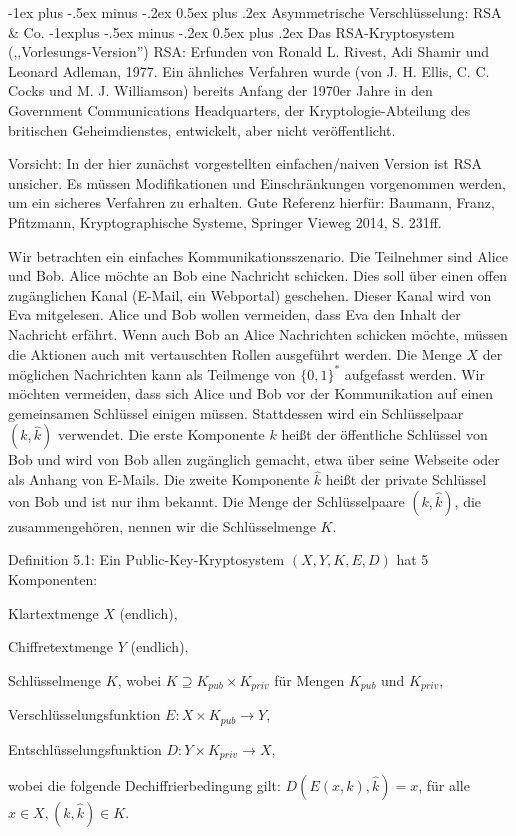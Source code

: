 \documentclass[a4paper]{article}
\makeatletter
\renewcommand{\section}{\@startsection{section}{1}{0mm}%
 {-1ex plus -.5ex minus -.2ex}%
 {0.5ex plus .2ex}%
 {\normalfont\large\bfseries}}
\renewcommand{\subsection}{\@startsection{subsection}{2}{0mm}%
 {-1explus -.5ex minus -.2ex}%
 {0.5ex plus .2ex}%
 {\normalfont\normalsize\bfseries}}
\makeatother
\begin{document}
\begin{multicols}{3}
        \section{Asymmetrische Verschlüsselung: RSA \& Co.}
        \subsection{Das RSA-Kryptosystem (,,Vorlesungs-Version'')}
        RSA: Erfunden von Ronald L. Rivest, Adi Shamir und Leonard Adleman, 1977. Ein ähnliches Verfahren wurde (von J. H. Ellis, C. C. Cocks und M. J. Williamson) bereits Anfang der 1970er Jahre in den Government Communications Headquarters, der Kryptologie-Abteilung des britischen Geheimdienstes, entwickelt, aber nicht veröffentlicht.

        Vorsicht: In der hier zunächst vorgestellten einfachen/naiven Version ist RSA unsicher. Es müssen Modifikationen und Einschränkungen vorgenommen werden, um ein
        sicheres Verfahren zu erhalten. Gute Referenz hierfür: Baumann, Franz, Pfitzmann, Kryptographische Systeme, Springer Vieweg 2014, S. 231ff.

        Wir betrachten ein einfaches Kommunikationsszenario. Die Teilnehmer sind Alice und Bob. Alice möchte an Bob eine Nachricht schicken. Dies soll über einen offen zugänglichen Kanal (E-Mail, ein Webportal) geschehen. Dieser Kanal wird von Eva mitgelesen. Alice und Bob wollen vermeiden, dass Eva den Inhalt der Nachricht erfährt. Wenn auch Bob an Alice Nachrichten schicken möchte, müssen die Aktionen auch mit vertauschten Rollen ausgeführt werden.
        Die Menge $X$ der möglichen Nachrichten kann als Teilmenge von $\{0,1\}^*$ aufgefasst werden. Wir möchten vermeiden, dass sich Alice und Bob vor der Kommunikation auf einen gemeinsamen Schlüssel einigen müssen. Stattdessen wird ein Schlüsselpaar $(k,\hat{k})$ verwendet. Die erste Komponente $k$ heißt der öffentliche Schlüssel von Bob und wird von Bob allen zugänglich gemacht, etwa über seine Webseite oder als Anhang von E-Mails. Die zweite Komponente $\hat{k}$ heißt der private Schlüssel von Bob und ist nur ihm bekannt. Die Menge der Schlüsselpaare $(k,\hat{k})$, die zusammengehören, nennen wir die Schlüsselmenge $K$.

        Definition 5.1: Ein Public-Key-Kryptosystem $(X,Y,K,E,D)$ hat 5 Komponenten:
        \begin{itemize*}
            \item Klartextmenge $X$ (endlich),
            \item  Chiffretextmenge $Y$ (endlich),
            \item  Schlüsselmenge $K$, wobei $K\supseteq K_{pub} \times K_{priv}$ für Mengen $K_{pub}$ und $K_{priv}$,
            \item  Verschlüsselungsfunktion $E:X\times K_{pub} \rightarrow Y$,
            \item  Entschlüsselungsfunktion $D:Y\times K_{priv} \rightarrow X$,
            \item  wobei die folgende Dechiffrierbedingung gilt: $D(E(x,k), \hat{k}) =x$, für alle $x\in X,(k,\hat{k})\in K$.
        \end{itemize*}


\end{multicols}
\end{document}
